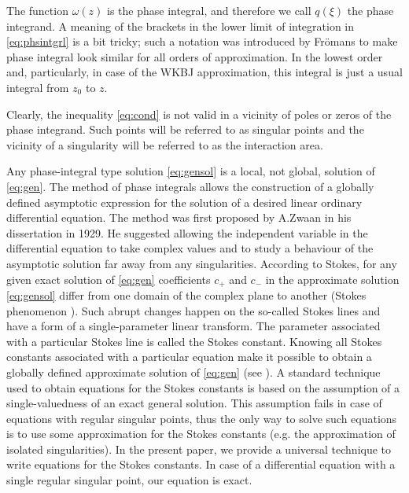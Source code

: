 \documentclass[aip,jmp,reprint]{revtex4-1}
\def\w{\omega}
\newcommand\phsintgrnd[1][z]{q(#1)}
\begin{document}
The function $\w(z)$ is the phase integral, and therefore we call $\phsintgrnd[\xi]$ 
the phase integrand. A meaning of the brackets in the lower limit of integration in \eqref{eq:phsintgrl}
is a bit tricky; such a notation was introduced by Fr\"omans \cite{frpaper} to make
phase integral look similar for all orders of approximation. In the lowest order and, particularly,
in case of the WKBJ approximation, this integral is just a usual integral from $z_0$ to $z$. 

Clearly, the inequality \eqref{eq:cond} is not valid in a vicinity of poles or zeros of 
the phase integrand. Such points will be referred to as singular points and the 
vicinity of a singularity will be referred to as the interaction area.

Any phase-integral type solution \eqref{eq:gensol} is a local, not global, solution of \eqref{eq:gen}. 
The method of phase integrals allows the construction of a globally defined 
asymptotic expression for the solution of a desired linear ordinary differential 
equation. The method was first proposed by A.Zwaan\cite{zwaan} in his dissertation in 1929. 
He suggested allowing the independent variable in the differential equation to take 
complex values and to study a behaviour of the asymptotic solution far away from any 
singularities. According to Stokes\cite{stokes}, for any given exact solution 
of \eqref{eq:gen} coefficients $c_+$ and $c_-$ in the approximate solution \eqref{eq:gensol} 
differ from one domain of the complex plane to another 
(Stokes phenomenon \cite{stokes,rwbook,heading,frbook}). Such abrupt 
changes happen on the so-called Stokes lines and have a form of a single-parameter 
linear transform\cite{heading}. The parameter associated with a particular Stokes line 
is called the Stokes constant. Knowing all Stokes constants associated with a particular 
equation make it possible to obtain a globally defined approximate solution 
of \eqref{eq:gen} (see ). A standard technique\cite{frpaper} used to obtain
equations for the Stokes constants is based on the assumption of a single-valuedness of
an exact general solution. This assumption fails in case of equations with regular singular points\cite{cbbook}, thus
the only way to solve such equations is to use some approximation for the Stokes constants\cite{rwbook, ours}
(e.g. the approximation of isolated singularities\cite{rwbook}). In the present paper, we provide a universal
technique to write equations for the Stokes constants. In case of a differential equation with
a single regular singular point, our equation is exact.
\end{document}
